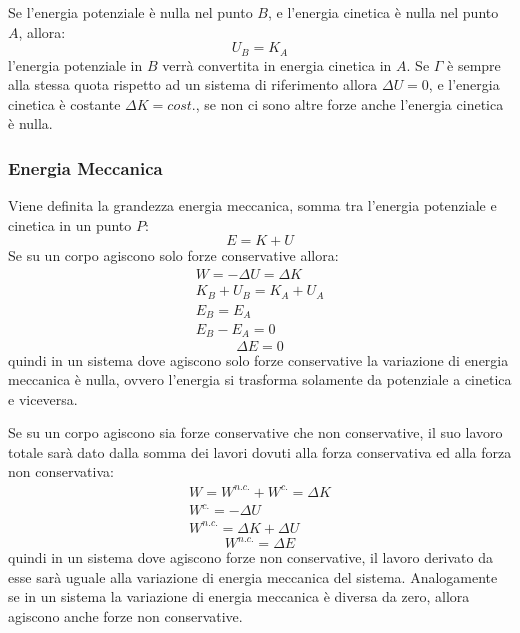 \documentclass{article}
\numberwithin{equation}{subsection}
\begin{document}
Se l'energia potenziale è nulla nel punto $B$, e l'energia cinetica 
è nulla nel punto $A$, allora:
\begin{equation}
    U_B=K_A
\end{equation}
l'energia potenziale in $B$ verrà convertita in energia cinetica in $A$.
Se $\Gamma$ è sempre alla stessa 
quota rispetto ad un sistema di riferimento allora $\Delta U=0$, 
e l'energia cinetica è costante $\Delta K = cost.$, se non ci sono 
altre forze anche l'energia cinetica è nulla.

\subsubsection{Energia Meccanica}
Viene definita la grandezza energia meccanica, somma tra 
l'energia potenziale e cinetica in un punto $P$:
\begin{equation}
    E=K+U
\end{equation}
Se su un corpo agiscono solo forze conservative allora:
\begin{gather*}
    W=-\Delta U = \Delta K\\    
    K_B+U_B=K_A+U_A\\
    E_B=E_A\\
    E_B-E_A=0
\end{gather*}
\begin{equation}
    \Delta E=0
\end{equation}
quindi in un sistema dove agiscono solo forze conservative la 
variazione di energia meccanica è nulla, ovvero l'energia si 
trasforma solamente da potenziale a cinetica e viceversa. 




Se su un corpo agiscono sia forze conservative che non 
conservative, il suo lavoro totale sarà dato dalla somma dei 
lavori dovuti alla forza conservativa ed alla forza non 
conservativa: 
\begin{gather*}
    W=W^{n.c.}+W^{c.}=\Delta K\\
    W^{c.}=-\Delta U\\
    W^{n.c.}=\Delta K +\Delta U
\end{gather*}
\begin{equation}
    W^{n.c.}=\Delta E
\end{equation}
quindi in un sistema dove agiscono forze non conservative, il 
lavoro derivato da esse sarà uguale alla variazione di energia 
meccanica del sistema. Analogamente se in un sistema la 
variazione di energia meccanica è diversa da zero, allora 
agiscono anche forze non conservative.
\end{document}
